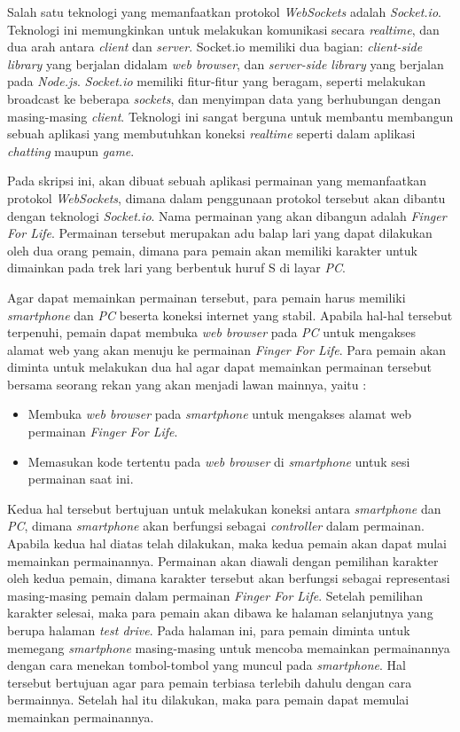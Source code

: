 \documentclass[a4paper,twoside]{article}
\begin{document}
Salah satu teknologi yang memanfaatkan protokol \textit{WebSockets} adalah \textit{Socket.io}. Teknologi ini memungkinkan untuk melakukan komunikasi secara \textit{realtime}, dan dua arah antara \textit{client} dan \textit{server}. Socket.io memiliki dua bagian: \textit{client-side library} yang berjalan didalam \textit{web browser}, dan \textit{server-side library} yang berjalan pada \textit{Node.js}. \textit{Socket.io} memiliki fitur-fitur yang beragam, seperti melakukan broadcast ke beberapa \textit{sockets}, dan menyimpan data yang berhubungan dengan masing-masing \textit{client}. Teknologi ini sangat berguna untuk membantu membangun sebuah aplikasi yang membutuhkan koneksi \textit{realtime} seperti dalam aplikasi \textit{chatting} maupun \textit{game}.

Pada skripsi ini, akan dibuat sebuah aplikasi permainan yang memanfaatkan protokol \textit{WebSockets}, dimana dalam penggunaan protokol tersebut akan dibantu dengan teknologi \textit{Socket.io}. Nama permainan yang akan dibangun adalah \textit{Finger For Life}. Permainan tersebut merupakan adu balap lari yang dapat dilakukan oleh dua orang pemain, dimana para pemain akan memiliki karakter untuk dimainkan pada trek lari yang berbentuk huruf S di layar \textit{PC}.

Agar dapat memainkan permainan tersebut, para pemain harus memiliki \textit{smartphone} dan \textit{PC} beserta koneksi internet yang stabil. Apabila hal-hal tersebut terpenuhi, pemain dapat membuka \textit{web browser} pada \textit{PC} untuk mengakses alamat web yang akan menuju ke permainan \textit{Finger For Life}. Para pemain akan diminta untuk melakukan dua hal agar dapat memainkan permainan tersebut bersama seorang rekan yang akan menjadi lawan mainnya, yaitu : 

\begin{itemize}
	\item Membuka \textit{web browser} pada \textit{smartphone} untuk mengakses alamat web permainan \textit{Finger For Life}.
	\item Memasukan kode tertentu pada \textit{web browser} di \textit{smartphone} untuk sesi permainan saat ini.
\end{itemize}

Kedua hal tersebut bertujuan untuk melakukan koneksi antara \textit{smartphone} dan \textit{PC}, dimana \textit{smartphone} akan berfungsi sebagai \textit{controller} dalam permainan. Apabila kedua hal diatas telah dilakukan, maka kedua pemain akan dapat mulai memainkan permainannya.  Permainan akan diawali dengan pemilihan karakter oleh kedua pemain, dimana karakter tersebut akan berfungsi sebagai representasi masing-masing pemain dalam permainan \textit{Finger For Life}. Setelah pemilihan karakter selesai, maka para pemain akan dibawa ke halaman selanjutnya yang berupa halaman \textit{test drive}. Pada halaman ini, para pemain diminta untuk memegang \textit{smartphone} masing-masing untuk mencoba memainkan permainannya dengan cara menekan tombol-tombol yang muncul pada \textit{smartphone}. Hal tersebut bertujuan agar para pemain terbiasa terlebih dahulu dengan cara bermainnya. Setelah hal itu dilakukan, maka para pemain dapat memulai memainkan permainannya.
\end{document}
